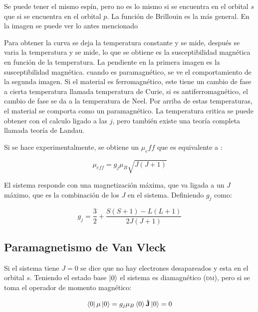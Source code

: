 \documentclass[11pt,fleqn]{book}
\renewcommand{\vec}[1]{\mathbf{#1}}
\begin{document}
Se puede tener el mismo espín, pero no es lo mismo si se encuentra en el orbital $s$ que si se encuentra en el orbital $p$. La función de Brillouin es la más general. En la imagen se puede ver lo antes mencionado





Para obtener la curva se deja la temperatura constante y se mide, después se varia la temperatura y se mide, lo que se obtiene es la susceptibilidad magnética en función de la temperatura. La pendiente en la primera imagen es la susceptibilidad magnética.  cuando es paramagnético, se ve el comportamiento de la segunda imagen. Si el material es ferromagnético, este tiene un cambio de fase a cierta temperatura llamada temperatura de Curie, si es antiferromagnético, el cambio de fase se da a la temperatura de Neel. Por arriba de estas temperaturas, el material se comporta como un paramagnético. La temperatura critica se puede obtener con el calculo ligado a las $j$, pero también existe una teoría completa llamada teoría de Landau.

Si se hace experimentalmente, se obtiene un $\mu_eff$ que es equivalente a :

\begin{equation}
    \mu_{eff}=g_{j}\mu_{B}\sqrt{J(J+1)}
    \label{Eq. 3.31}
\end{equation}

El sistema responde con una magnetización máxima, que va ligada a un $J$ máximo, que es la combinación de los $J$ en el sistema. Definiendo $g_{j}$ como:

\begin{equation*}
    g_{j}=\frac{3}{2}+\frac{S(S+1)-L(L+1)}{2J(J+1)}
\end{equation*}

\subsection{Paramagnetismo de Van Vleck}

Si el sistema tiene $J=0$ se dice que no hay electrones desapareados y esta en el orbital $s$. Teniendo el estado base $\ket{0}$ el sistema es diamagnético (\textsc{dm}), pero si se toma el operador de momento magnético:

\begin{equation}
    \bra{0}\mu\ket{0}=g_{j}\mu_{B}\braket{0}\hat{\vec{J}}\ket{0}=0
    \label{Eq. 3.32}
\end{equation}
\end{document}
